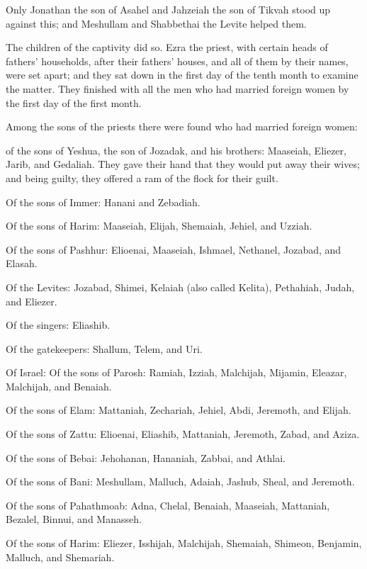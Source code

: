 \myverse{}Only Jonathan the son of Asahel and Jahzeiah the son of Tikvah
stood up against this; and Meshullam and Shabbethai the Levite helped them.

\myverse{}The children of the captivity did so. Ezra the priest, with
certain heads of fathers’ households, after their fathers’ houses, and all of them by their names, were
set apart; and they sat down in the first day of the tenth month to examine the matter.
\myverse{}They finished with all the men who had married foreign women by the first
day of the first month.

\myverse{}Among the sons of the priests there were found who had married
foreign women:

of the sons of Yeshua, the son of Jozadak, and his brothers: Maaseiah, Eliezer,
Jarib, and Gedaliah.
\myverse{}They gave their hand that they would put away their wives; and being guilty,
they offered a ram of the flock for their guilt.

\myverse{}Of the sons of Immer: Hanani and Zebadiah.

\myverse{}Of the sons of Harim: Maaseiah, Elijah, Shemaiah,
Jehiel, and Uzziah.

\myverse{}Of the sons of Pashhur: Elioenai, Maaseiah, Ishmael,
Nethanel, Jozabad, and Elasah.

\myverse{}Of the Levites: Jozabad, Shimei, Kelaiah (also called
Kelita), Pethahiah, Judah, and Eliezer.

\myverse{}Of the singers: Eliashib.

Of the gatekeepers: Shallum, Telem, and Uri.

\myverse{}Of Israel: Of the sons of Parosh: Ramiah, Izziah,
Malchijah, Mijamin, Eleazar, Malchijah, and Benaiah.

\myverse{}Of the sons of Elam: Mattaniah, Zechariah, Jehiel,
Abdi, Jeremoth, and Elijah.

\myverse{}Of the sons of Zattu: Elioenai, Eliashib, Mattaniah,
Jeremoth, Zabad, and Aziza.

\myverse{}Of the sons of Bebai: Jehohanan, Hananiah, Zabbai,
and Athlai.

\myverse{}Of the sons of Bani: Meshullam, Malluch, Adaiah,
Jashub, Sheal, and Jeremoth.

\myverse{}Of the sons of Pahathmoab: Adna, Chelal, Benaiah,
Maaseiah, Mattaniah, Bezalel, Binnui, and Manasseh.

\myverse{}Of the sons of Harim: Eliezer, Isshijah, Malchijah,
Shemaiah, Shimeon,
\myverse{}Benjamin, Malluch, and Shemariah.

